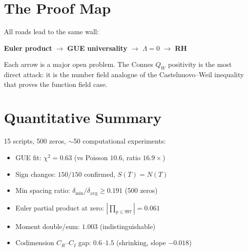 \documentclass[11pt]{article}
\begin{document}
\section{The Proof Map}

All roads lead to the same wall:

\medskip
\begin{center}
\textbf{Euler product} $\longrightarrow$ \textbf{GUE universality} $\longrightarrow$ \textbf{$\Lambda = 0$} $\longrightarrow$ \textbf{RH}
\end{center}
\medskip

\noindent Each arrow is a major open problem. The Connes $Q_W$ positivity is the most direct attack: it is the number field analogue of the Castelnuovo--Weil inequality that proves the function field case.

\section{Quantitative Summary}
15 scripts, 500 zeros, $\sim$50 computational experiments:
\begin{itemize}
\item GUE fit: $\chi^2 = 0.63$ (vs Poisson $10.6$, ratio $16.9\times$)
\item Sign changes: $150/150$ confirmed, $S(T) = N(T)$
\item Min spacing ratio: $\delta_{\min}/\delta_{\mathrm{avg}} \geq 0.191$ (500 zeros)
\item Euler partial product at zero: $|{\textstyle\prod_{p\leq 997}}| = 0.061$
\item Moment double/sum: $1.003$ (indistinguishable)
\item Codimension $C_R$--$C_I$ gap: $0.6$--$1.5$ (shrinking, slope $-0.018$)
\end{itemize}
\end{document}
